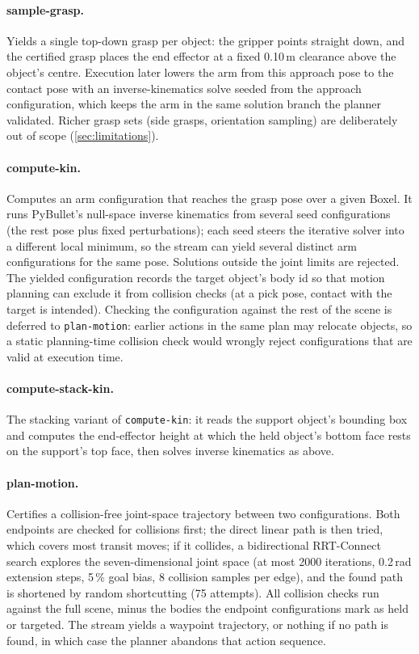 \paragraph{sample-grasp.} Yields a single top-down grasp per object: the gripper points straight down, and the certified grasp places the end effector at a fixed 0.10\,m clearance above the object's centre. Execution later lowers the arm from this approach pose to the contact pose with an inverse-kinematics solve seeded from the approach configuration, which keeps the arm in the same solution branch the planner validated. Richer grasp sets (side grasps, orientation sampling) are deliberately out of scope (\cref{sec:limitations}).

\paragraph{compute-kin.} Computes an arm configuration that reaches the grasp pose over a given Boxel. It runs PyBullet's null-space inverse kinematics from several seed configurations (the rest pose plus fixed perturbations); each seed steers the iterative solver into a different local minimum, so the stream can yield several distinct arm configurations for the same pose. Solutions outside the joint limits are rejected. The yielded configuration records the target object's body id so that motion planning can exclude it from collision checks (at a pick pose, contact with the target is intended). Checking the configuration against the rest of the scene is deferred to \texttt{plan-motion}: earlier actions in the same plan may relocate objects, so a static planning-time collision check would wrongly reject configurations that are valid at execution time.

\paragraph{compute-stack-kin.} The stacking variant of \texttt{compute-kin}: it reads the support object's bounding box and computes the end-effector height at which the held object's bottom face rests on the support's top face, then solves inverse kinematics as above.

\paragraph{plan-motion.} Certifies a collision-free joint-space trajectory between two configurations. Both endpoints are checked for collisions first; the direct linear path is then tried, which covers most transit moves; if it collides, a bidirectional RRT-Connect search \cite{kuffner2000rrt} explores the seven-dimensional joint space (at most 2000 iterations, 0.2\,rad extension steps, 5\,\% goal bias, 8 collision samples per edge), and the found path is shortened by random shortcutting (75 attempts). All collision checks run against the full scene, minus the bodies the endpoint configurations mark as held or targeted. The stream yields a waypoint trajectory, or nothing if no path is found, in which case the planner abandons that action sequence.

